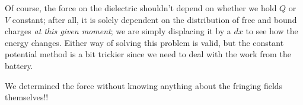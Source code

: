 \begin{remark}
Of course, the force on the dielectric shouldn't depend on whether we hold $Q$ or $V$ constant; after all, it is solely dependent on the distribution of free and bound charges \textit{at this given moment}; we are simply displacing it by a $dx$ to see how the energy changes. Either way of solving this problem is valid, but the constant potential method is a bit trickier since we need to deal with the work from the battery.
\end{remark}

We determined the force without knowing anything about the fringing fields themselves!! 

